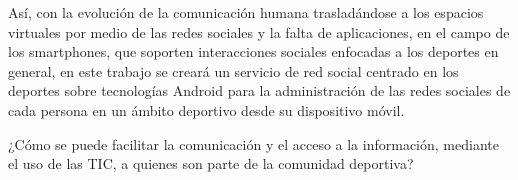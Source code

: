 Así, con la evolución de la comunicación humana trasladándose a los espacios virtuales por medio de las redes sociales y la falta de aplicaciones, en el campo de los smartphones, que soporten interacciones sociales enfocadas a los deportes en general, en este trabajo se creará un servicio de red social centrado en los deportes sobre tecnologías Android para la administración de las redes sociales de cada persona en un ámbito deportivo desde su dispositivo móvil.

¿Cómo se puede facilitar la comunicación y el acceso a la información, mediante el uso de las TIC, a quienes son parte de la comunidad deportiva?
